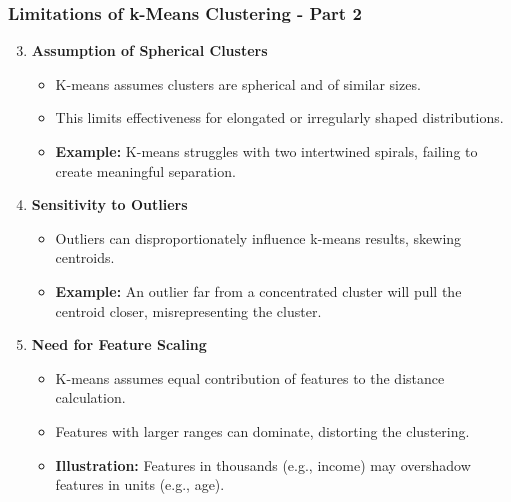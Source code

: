 \documentclass[aspectratio=169]{beamer}
\begin{document}
\begin{frame}[fragile]
    \frametitle{Limitations of k-Means Clustering - Part 2}
    \begin{enumerate}
        \setcounter{enumi}{2} %
        \item \textbf{Assumption of Spherical Clusters}  
        \begin{itemize}
            \item K-means assumes clusters are spherical and of similar sizes.
            \item This limits effectiveness for elongated or irregularly shaped distributions.
            \item \textbf{Example:} K-means struggles with two intertwined spirals, failing to create meaningful separation.
        \end{itemize}

        \item \textbf{Sensitivity to Outliers}  
        \begin{itemize}
            \item Outliers can disproportionately influence k-means results, skewing centroids.
            \item \textbf{Example:} An outlier far from a concentrated cluster will pull the centroid closer, misrepresenting the cluster.
        \end{itemize}

        \item \textbf{Need for Feature Scaling}  
        \begin{itemize}
            \item K-means assumes equal contribution of features to the distance calculation.
            \item Features with larger ranges can dominate, distorting the clustering.
            \item \textbf{Illustration:} Features in thousands (e.g., income) may overshadow features in units (e.g., age).
        \end{itemize}
    \end{enumerate}
\end{frame}
\end{document}
